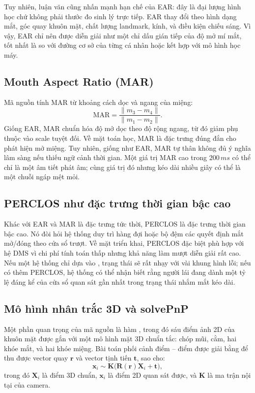 \documentclass[12pt,a4paper]{article}
\begin{document}
Tuy nhiên, luận văn cũng nhấn mạnh hạn chế của EAR: đây là đại lượng hình học chứ không phải thước đo sinh lý trực tiếp. EAR thay đổi theo hình dạng mắt, góc quay khuôn mặt, chất lượng landmark, kính, và điều kiện chiếu sáng. Vì vậy, EAR chỉ nên được diễn giải như một chỉ dấu gián tiếp của độ mở mí mắt, tốt nhất là so với đường cơ sở của từng cá nhân hoặc kết hợp với mô hình học máy.

\subsection{Mouth Aspect Ratio (MAR)}
Mã nguồn tính MAR từ khoảng cách dọc và ngang của miệng:
\[
\mathrm{MAR} = \frac{\lVert m_3 - m_4 \rVert}{\lVert m_1 - m_2 \rVert}.
\]
Giống EAR, MAR chuẩn hóa độ mở dọc theo độ rộng ngang, từ đó giảm phụ thuộc vào scale tuyệt đối. Về mặt toán học, MAR là đặc trưng đúng đắn cho phát hiện mở miệng. Tuy nhiên, giống như EAR, MAR tự thân không đủ ý nghĩa lâm sàng nếu thiếu ngữ cảnh thời gian. Một giá trị MAR cao trong \(200\,ms\) có thể chỉ là một âm tiết phát âm; cùng giá trị đó nhưng kéo dài nhiều giây có thể là một chuỗi ngáp mệt mỏi.

\subsection{PERCLOS như đặc trưng thời gian bậc cao}
Khác với EAR và MAR là đặc trưng tức thời, PERCLOS là đặc trưng thời gian bậc cao. Nó đòi hỏi hệ thống duy trì hàng đợi hoặc bộ đệm các quyết định mắt mở/đóng theo cửa sổ trượt. Về mặt triển khai, PERCLOS đặc biệt phù hợp với hệ DMS vì chi phí tính toán thấp nhưng khả năng làm mượt diễn giải rất cao. Nếu một hệ thống chỉ dựa vào , trạng thái sẽ rất nhạy với vài khung hình lỗi; nếu có thêm PERCLOS, hệ thống có thể nhận biết rằng người lái đang dành một tỷ lệ đáng kể của cửa sổ quan sát gần nhất trong trạng thái nhắm mắt kéo dài.

\subsection{Mô hình nhân trắc 3D và solvePnP}
Một phần quan trọng của mã nguồn là hàm , trong đó sáu điểm ảnh 2D của khuôn mặt được gắn với một mô hình mặt 3D chuẩn tắc: chóp mũi, cằm, hai khóe mắt, và hai khóe miệng. Bài toán phối cảnh điểm -- điểm được giải bằng  để thu được vector quay \(\mathbf{r}\) và vector tịnh tiến \(\mathbf{t}\), sao cho:
\[
\mathbf{x}_i \sim \mathbf{K}\bigl(\mathbf{R}(\mathbf{r})\mathbf{X}_i + \mathbf{t}\bigr),
\]
trong đó \(\mathbf{X}_i\) là điểm 3D chuẩn, \(\mathbf{x}_i\) là điểm 2D quan sát được, và \(\mathbf{K}\) là ma trận nội tại của camera.
\end{document}
